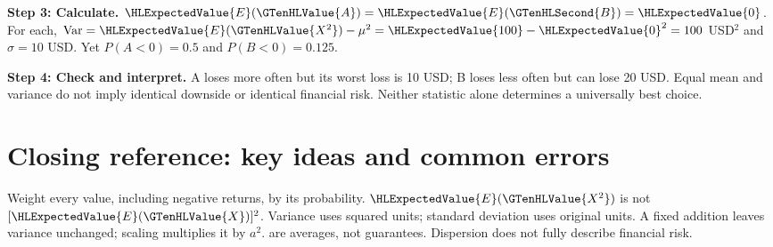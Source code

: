 \par\noindent\begin{minipage}{\linewidth}
\textbf{Step 3: Calculate.} $\HLExpectedValue{E}(\GTenHLValue{A})=\HLExpectedValue{E}(\GTenHLSecond{B})=\HLExpectedValue{0}$. For each, $\operatorname{Var}=\HLExpectedValue{E}(\GTenHLValue{X^2})-\mu^2=\HLExpectedValue{100}-\HLExpectedValue{0}^2=100$ USD$^2$ and $\sigma=10$ USD. Yet $P(A<0)=0.5$ and $P(B<0)=0.125$.
\end{minipage}\par\medskip
\par\noindent\begin{minipage}{\linewidth}
\textbf{Step 4: Check and interpret.} A loses more often but its worst loss is 10 USD; B loses less often but can lose 20 USD. Equal mean and variance do not imply identical downside or identical financial risk. Neither statistic alone determines a universally best choice.
\end{minipage}\par\medskip
{}
\section{Closing reference: key ideas and common errors}
Weight every value, including negative returns, by its probability. $\HLExpectedValue{E}(\GTenHLValue{X^2})$ is not $[\HLExpectedValue{E}(\GTenHLValue{X})]^2$. Variance uses squared units; standard deviation uses original units. A fixed addition leaves variance unchanged; scaling multiplies it by $a^2$.  are averages, not guarantees. Dispersion does not fully describe financial risk.
\secInicio

